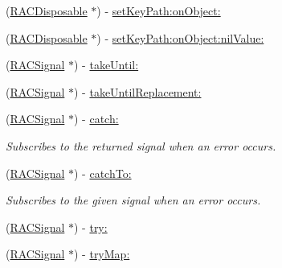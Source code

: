 \begin{DoxyCompactItemize}
\item 
(\mbox{\hyperlink{interface_r_a_c_disposable}{R\+A\+C\+Disposable}} $\ast$) -\/ \mbox{\hyperlink{category_r_a_c_signal_07_operations_08_ada2a2f51a30fb8bef13819c50ebfbf85}{set\+Key\+Path\+:on\+Object\+:}}
\item 
(\mbox{\hyperlink{interface_r_a_c_disposable}{R\+A\+C\+Disposable}} $\ast$) -\/ \mbox{\hyperlink{category_r_a_c_signal_07_operations_08_a3d59cca19be3e985aa5a08cb0386faeb}{set\+Key\+Path\+:on\+Object\+:nil\+Value\+:}}
\item 
(\mbox{\hyperlink{interface_r_a_c_signal}{R\+A\+C\+Signal}} $\ast$) -\/ \mbox{\hyperlink{category_r_a_c_signal_07_operations_08_afb214e9e69dc34880b306c118b8e56d4}{take\+Until\+:}}
\item 
(\mbox{\hyperlink{interface_r_a_c_signal}{R\+A\+C\+Signal}} $\ast$) -\/ \mbox{\hyperlink{category_r_a_c_signal_07_operations_08_aa8536c9726338e10176997936be011ed}{take\+Until\+Replacement\+:}}
\item 
\mbox{\label{category_r_a_c_signal_07_operations_08_a34c8a85e28adb1f26fcd769de19bc5bb}} 
(\mbox{\hyperlink{interface_r_a_c_signal}{R\+A\+C\+Signal}} $\ast$) -\/ \mbox{\hyperlink{category_r_a_c_signal_07_operations_08_a34c8a85e28adb1f26fcd769de19bc5bb}{catch\+:}}
\begin{DoxyCompactList}\small\item\em Subscribes to the returned signal when an error occurs. \end{DoxyCompactList}\item 
\mbox{\label{category_r_a_c_signal_07_operations_08_a0b1efe6d0548703cb25b8e436532e574}} 
(\mbox{\hyperlink{interface_r_a_c_signal}{R\+A\+C\+Signal}} $\ast$) -\/ \mbox{\hyperlink{category_r_a_c_signal_07_operations_08_a0b1efe6d0548703cb25b8e436532e574}{catch\+To\+:}}
\begin{DoxyCompactList}\small\item\em Subscribes to the given signal when an error occurs. \end{DoxyCompactList}\item 
(\mbox{\hyperlink{interface_r_a_c_signal}{R\+A\+C\+Signal}} $\ast$) -\/ \mbox{\hyperlink{category_r_a_c_signal_07_operations_08_ac65d7a1a19db9cb2f78c03781995bbe9}{try\+:}}
\item 
(\mbox{\hyperlink{interface_r_a_c_signal}{R\+A\+C\+Signal}} $\ast$) -\/ \mbox{\hyperlink{category_r_a_c_signal_07_operations_08_a282c8989886b5b9a75e4ecb298221b58}{try\+Map\+:}}

\end{DoxyCompactItemize}
